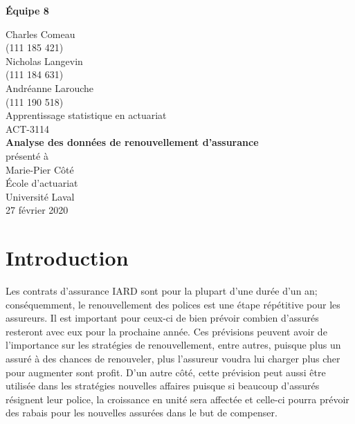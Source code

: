 \documentclass[]{article}
\author{}
\date{\vspace{-2.5em}}
\begin{document}
\newpage

\begin{flushright}
    \textbf{Équipe 8}
\end{flushright}

\begin{center}
    \vspace{2\baselineskip}
    Charles Comeau \\
    (111 185 421) \\ \vspace{1\baselineskip} Nicholas Langevin \\
    (111 184 631) \\
    \vspace{1\baselineskip}
    Andréanne Larouche \\
    (111 190 518) \\
    \vspace{7\baselineskip}
    Apprentissage statistique en actuariat\\
    ACT-3114 \\
    \vspace{7\baselineskip}
    {\large
    \textbf{Analyse des données de renouvellement d'assurance}} \\
    \vspace{8\baselineskip}
    présenté à \\
    Marie-Pier Côté \\
    \vspace{9\baselineskip}
    École d’actuariat \\
    Université Laval \\
    27 février 2020
\end{center}

\newpage

\tableofcontents

\newpage

\section{Introduction}\label{introduction}

Les contrats d'assurance IARD sont pour la plupart d'une durée d'un an;
conséquemment, le renouvellement des polices est une étape répétitive
pour les assureurs. Il est important pour ceux-ci de bien prévoir
combien d'assurés resteront avec eux pour la prochaine année. Ces
prévisions peuvent avoir de l'importance sur les stratégies de
renouvellement, entre autres, puisque plus un assuré à des chances de
renouveler, plus l'assureur voudra lui charger plus cher pour augmenter
sont profit. D'un autre côté, cette prévision peut aussi être utilisée
dans les stratégies nouvelles affaires puisque si beaucoup d'assurés
résignent leur police, la croissance en unité sera affectée et celle-ci
pourra prévoir des rabais pour les nouvelles assurées dans le but de
compenser.
\end{document}
